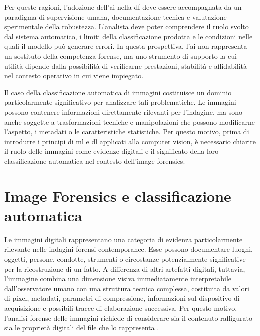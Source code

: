 Per queste ragioni, l'adozione dell'\gls{ai} nella \gls{df} deve essere accompagnata da un paradigma di supervisione umana, documentazione tecnica e valutazione sperimentale della robustezza. L'analista deve poter comprendere il ruolo svolto dal sistema automatico, i limiti della classificazione prodotta e le condizioni nelle quali il modello può generare errori. In questa prospettiva, l'\gls{ai} non rappresenta un sostituto della competenza forense, ma uno strumento di supporto la cui utilità dipende dalla possibilità di verificarne prestazioni, stabilità e affidabilità nel contesto operativo in cui viene impiegato.

Il caso della classificazione automatica di immagini costituisce un dominio particolarmente significativo per analizzare tali problematiche. Le immagini possono contenere informazioni direttamente rilevanti per l'indagine, ma sono anche soggette a trasformazioni tecniche e manipolazioni che possono modificarne l'aspetto, i metadati o le caratteristiche statistiche. Per questo motivo, prima di introdurre i principi di \gls{ml} e \gls{dl} applicati alla computer vision, è necessario chiarire il ruolo delle immagini come evidenze digitali e il significato della loro classificazione automatica nel contesto dell'image forensics.


\section{Image Forensics e classificazione automatica}
\label{sec:background_image_forensics}
Le immagini digitali rappresentano una categoria di evidenza particolarmente rilevante nelle indagini forensi contemporanee. Esse possono documentare luoghi, oggetti, persone, condotte, strumenti o circostanze potenzialmente significative per la ricostruzione di un fatto. A differenza di altri artefatti digitali, tuttavia, l'immagine combina una dimensione visiva immediatamente interpretabile dall'osservatore umano con una struttura tecnica complessa, costituita da valori di pixel, metadati, parametri di compressione, informazioni sul dispositivo di acquisizione e possibili tracce di elaborazione successiva. Per questo motivo, l'analisi forense delle immagini richiede di considerare sia il contenuto raffigurato sia le proprietà digitali del file che lo rappresenta \cite{farid2016photo,stamm2013information}.

